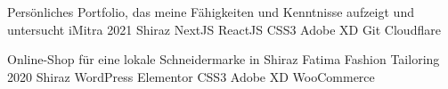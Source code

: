 \begin{cventries}
\cventry
{Persönliches Portfolio, das meine Fähigkeiten und Kenntnisse aufzeigt und untersucht} %
{iMitra} %
{2021} %
{Shiraz} %
{
  NextJS \mitdiv ReactJS \mitdiv CSS3 \mitdiv Adobe XD \mitdiv Git \mitdiv Cloudflare
}
% 
% 
% 

\cventry
{Online-Shop für eine lokale Schneidermarke in Shiraz} %
{Fatima Fashion Tailoring} %
{2020} %
{Shiraz} %
{
  WordPress \mitdiv Elementor \mitdiv CSS3 \mitdiv Adobe XD \mitdiv WooCommerce
}


\end{cventries}
